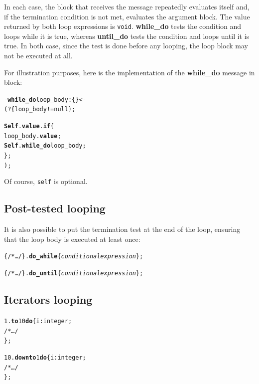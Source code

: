 \documentclass[11pt]{mybook}
\begin{document}
In each case, the block that receives the message repeatedly 
evaluates itself and, if the termination condition is not met, 
evaluates the argument block. 
The value returned by both loop expressions is {\tt void}. 
{\bf{}while\_do} tests the condition and loops while it is true,
whereas {\bf{}until\_do} tests the condition and loops until it is true. 
In both case, since the test is done before any looping, the loop
block may not be executed at all.


For illustration purposes, here is the implementation of the  {\bf
while\_do} message in {\sc{}block}:  

\begin{alltt} 
  - {\bf{}while\_do} loop\_body:{\sc{}\{ \}} <-
      ( ? \{loop\_body != {\sc{}null}\};

        {\bf{}Self}.{\bf{}value}.{\bf{}if} \{
          loop\_body.{\bf{}value};
          {\bf{}Self}.{\bf{}while\_do} loop\_body;
        \};
      );
\end{alltt}
Of course, {\tt self} is optional. 

\subsection{Post-tested looping}
\label{lisaac_world:loops:post-tested}
%
It is also possible to put the termination test at the end 
of the loop, ensuring that the loop body is executed at 
least once: 

\begin{alltt} 
    \{ /* \ldots */ \}.{\bf{}do\_while} \{ {\it{}conditional expression} \};

    \{ /* \ldots */ \}.{\bf{}do\_until} \{ {\it{}conditional expression} \};  
\end{alltt}

\subsection{Iterators looping}
\label{lisaac_world:loops:iterators}
%
\begin{alltt} 
    1.{\bf{}to} 10 {\bf{}do} \{ i:{\sc{}integer};
      /* \ldots */
    \};

    10.{\bf{}downto} 1 {\bf{}do} \{ i:{\sc{}integer};
      /* \ldots */
    \};    
\end{alltt}
\end{document}
